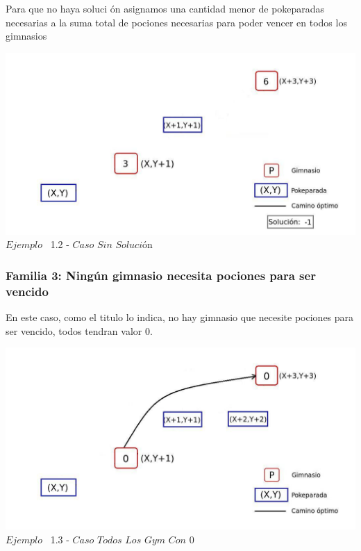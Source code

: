 Para que no haya soluci \'on asignamos una cantidad menor de pokeparadas necesarias a la suma total de pociones necesarias para poder vencer en todos los gimnasios\\
 
\vspace*{0.3cm} \vspace*{0.3cm}
  \begin{center}
 \includegraphics[scale=0.6]{./EJ1/sinSolucion1.jpeg}
 \\{$Ejemplo$ \ 1.2 - $Caso$ $Sin$ $Soluci$\'on}
  \end{center}
  \vspace*{0.3cm}
  
\begin{center}
 \subsubsection*{Familia 3: Ning\'un gimnasio necesita pociones para ser vencido}
\end{center}

En este caso, como el titulo lo indica, no hay gimnasio que necesite pociones para ser vencido, todos tendran valor 0.
 
\vspace*{0.3cm} \vspace*{0.3cm}
  \begin{center}
 \includegraphics[scale=0.6]{./EJ1/gym0.jpeg}
\\ {$Ejemplo$ \ 1.3 - $Caso$ $Todos$ $Los$ $Gym$ $Con$ $0$}
  \end{center}
  \vspace*{0.3cm}

